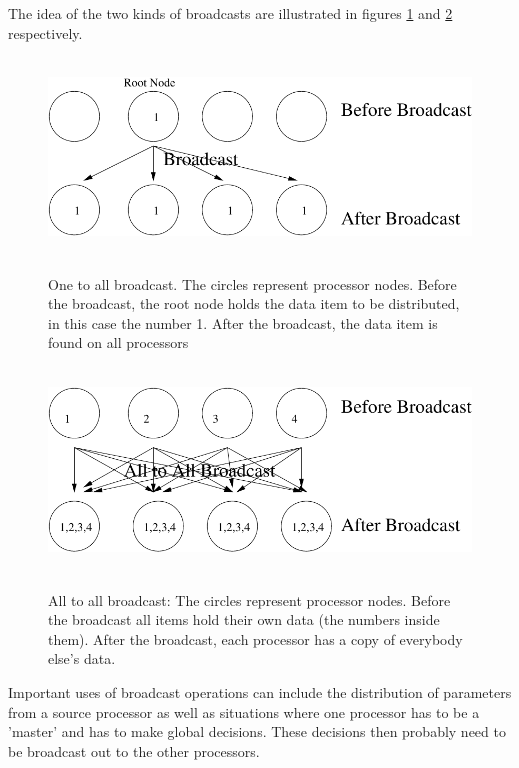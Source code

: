The idea of the two kinds of broadcasts are illustrated in figures
\ref{f:oneToAllBroadcast} and \ref{f:allToAllBroadcast} respectively.
\begin{figure}[h]
\begin{center}
\leavevmode
\hbox{%
\includegraphics{one_to_all_bcast}
}
\end{center}
\caption{One to all broadcast. The circles represent
processor nodes. Before the broadcast, the root node holds the data
item to be distributed, in this case the number 1. After the
broadcast, the data item is found on all processors}
\label{f:oneToAllBroadcast}
\end{figure}

\begin{figure}[h]
\begin{center}
\leavevmode
\hbox{%
\includegraphics{all_to_all_bcast}
}
\end{center}
\caption{All to all broadcast: The circles represent processor nodes.
Before the broadcast all items hold their own data (the numbers inside 
them). After the broadcast, each processor has a copy of everybody 
else's data.}
\label{f:allToAllBroadcast}
\end{figure}

Important uses of broadcast operations can include the distribution
of parameters from a source processor as well as situations where 
one processor has to be a 'master' and has to make global decisions.
These decisions then probably need to be broadcast out to the other processors.

